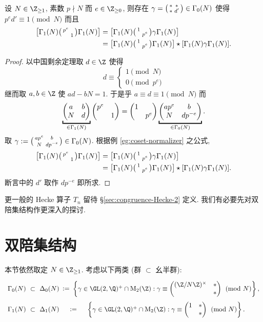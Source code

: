 \begin{lemma}\label{prop:Hecke-adjoint-aux}
	设 $N \in \Z_{\geq 1}$, 素数 $p \nmid N$ 而 $e \in \Z_{\geq 0}$, 则存在 $\gamma = \bigl(\begin{smallmatrix} * & * \\ * & d' \end{smallmatrix}\bigr) \in \Gamma_0(N)$ 使得 $p^e d' \equiv 1 \pmod N$ 而且
	\begin{align*}
	\left[\Gamma_1(N) \bigl(\begin{smallmatrix} p^e &  \\  & 1 \end{smallmatrix}\bigr) \Gamma_1(N)\right] & = \left[\Gamma_1(N) \bigl(\begin{smallmatrix} 1 &  \\  & p^e \end{smallmatrix}\bigr) \gamma \Gamma_1(N)\right]  \\
	& = \left[\Gamma_1(N) \bigl(\begin{smallmatrix} 1 &  \\  & p^e \end{smallmatrix}\bigr) \Gamma_1(N)\right] \star [\Gamma_1(N) \gamma \Gamma_1(N)].
	\end{align*}
\end{lemma}
\begin{proof}
	以中国剩余定理取 $d \in \Z$ 使得
	\[ d \equiv \begin{cases} 1 \pmod N \\ 0 \pmod{p^e} \end{cases} \]
	继而取 $a,b \in \Z$ 使 $ad-bN=1$. 于是乎 $a \equiv d \equiv 1 \pmod{N}$ 而
	\[ \underbracket{\twobigmatrix{a}{b}{N}{d}}_{\in \Gamma_1(N)} \twobigmatrix{p^e}{}{}{1} = \twobigmatrix{1}{}{}{p^e} \underbracket{\twobigmatrix{ap^e}{b}{N}{d p^{-e}}}_{\in \Gamma_0(N)}. \]
	取 $\gamma := \bigl(\begin{smallmatrix} ap^e & b \\ N & d p^{-e} \end{smallmatrix}\bigr) \in \Gamma_0(N)$. 根据例 \ref{eg:coset-normalizer} 之公式,
	\begin{align*}
	\left[ \Gamma_1(N) \bigl(\begin{smallmatrix} p^e &  \\  & 1 \end{smallmatrix}\bigr) \Gamma_1(N) \right] & = \left[\Gamma_1(N) \bigl(\begin{smallmatrix} 1 &  \\  & p^e \end{smallmatrix}\bigr) \gamma \Gamma_1(N) \right] \\
	& = \left[ \Gamma_1(N) \bigl(\begin{smallmatrix} 1 &  \\  & p^e \end{smallmatrix}\bigr) \Gamma_1(N) \right] \star [\Gamma_1(N) \gamma \Gamma_1(N)].
	\end{align*}
	断言中的 $d'$ 取作 $dp^{-e}$ 即所求.
\end{proof}

更一般的 Hecke 算子 $T_n$ 留待 \S\ref{sec:congruence-Hecke-2} 定义. 我们有必要先对双陪集结构作更深入的探讨.

\section{双陪集结构}\label{sec:congruence-Hecke-alg}
本节依然取定 $N \in \Z_{\geq 1}$. 考虑以下两类 (群 $\subset$ 幺半群):
\[\begin{tikzcd}[row sep=0pt, column sep=small]
	\Gamma_0(N) \arrow[phantom, r, "\subset" sloped] & \Delta_0(N) \arrow[phantom, r, ":=" sloped] & \left\{ \gamma \in \GL(2,\Q)^+ \cap \Mat_2(\Z) : \gamma \equiv \twobigmatrix{(\Z/N\Z)^\times}{*}{}{*} \pmod N \right\}, \\
	\Gamma_1(N) \arrow[phantom, r, "\subset" sloped] & \Delta_1(N) \arrow[phantom, r, ":=" sloped] & \left\{ \gamma \in \GL(2,\Q)^+ \cap \Mat_2(\Z) : \gamma \equiv \twobigmatrix{1}{*}{}{*} \pmod N \right\}.
\end{tikzcd}\]

